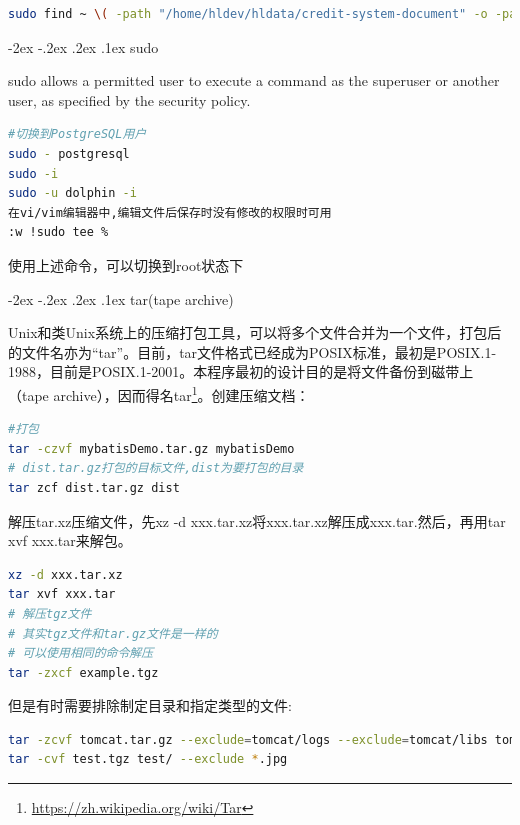 \documentclass[12pt]{book}
\makeatletter
\numberwithin{dummy}{section}
\theoremstyle{ocrenumbox}
\theoremstyle{blacknumex}
\theoremstyle{blacknumbox}
\theoremstyle{ocrenum}
\renewcommand\paragraph{\@startsection{paragraph}{4}{\z@}
	{-2ex \@plus-.2ex \@minus .2ex}
	{.1ex}
	{\normalfont\small\sffamily\bfseries}}
\makeatother
\begin{document}
\begin{lstlisting}[language=Bash]
sudo find ~ \( -path "/home/hldev/hldata/credit-system-document" -o -path "/home/hldev/hldata/credit-system-document" \) -prune -o -type f -name "*概要设计*"  -print
\end{lstlisting}


\paragraph{sudo}

sudo allows a permitted user to execute a command as the superuser or another user, as specified by the security policy. 

\begin{lstlisting}[language=Bash]
#切换到PostgreSQL用户
sudo - postgresql
sudo -i
sudo -u dolphin -i
在vi/vim编辑器中,编辑文件后保存时没有修改的权限时可用
:w !sudo tee %
\end{lstlisting}

使用上述命令，可以切换到root状态下

\paragraph{tar(tape archive)}

Unix和类Unix系统上的压缩打包工具，可以将多个文件合并为一个文件，打包后的文件名亦为“tar”。目前，tar文件格式已经成为POSIX标准，最初是POSIX.1-1988，目前是POSIX.1-2001。本程序最初的设计目的是将文件备份到磁带上（tape archive），因而得名tar\footnote{\url{https://zh.wikipedia.org/wiki/Tar}}。创建压缩文档：

\begin{lstlisting}[language=Bash]
#打包
tar -czvf mybatisDemo.tar.gz mybatisDemo
# dist.tar.gz打包的目标文件,dist为要打包的目录
tar zcf dist.tar.gz dist
\end{lstlisting}

解压tar.xz压缩文件，先xz -d xxx.tar.xz将xxx.tar.xz解压成xxx.tar.然后，再用tar xvf xxx.tar来解包。

\begin{lstlisting}[language=Bash]
xz -d xxx.tar.xz
tar xvf xxx.tar
# 解压tgz文件
# 其实tgz文件和tar.gz文件是一样的
# 可以使用相同的命令解压	
tar -zxcf example.tgz
\end{lstlisting}

但是有时需要排除制定目录和指定类型的文件:

\begin{lstlisting}[language=Bash]
tar -zcvf tomcat.tar.gz --exclude=tomcat/logs --exclude=tomcat/libs tomcat
tar -cvf test.tgz test/ --exclude *.jpg
\end{lstlisting}
\end{document}
